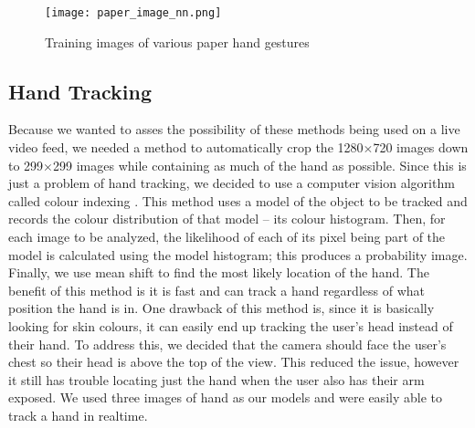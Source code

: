 \begin{figure}[h]
\texttt{[image: paper\_image\_nn.png]}
\centering
\caption{Training images of various paper hand gestures}
\end{figure}



\subsection{Hand Tracking}
Because we wanted to asses the possibility of these methods being used on a live video feed, we needed a method to automatically crop the 1280$\times$720 images down to 299$\times$299 images while containing as much of the hand as possible. Since this is just a problem of hand tracking, we decided to use a computer vision algorithm called colour indexing \cite{swain}. This method uses a model of the object to be tracked and records the colour distribution of that model -- its colour histogram. Then, for each image to be analyzed, the likelihood of each of its pixel being part of the model is calculated using the model histogram; this produces a probability image. Finally, we use mean shift to find the most likely location of the hand. The benefit of this method is it is fast and can track a hand regardless of what position the hand is in. One drawback of this method is, since it is basically looking for skin colours, it can easily end up tracking the user's head instead of their hand. To address this, we decided that the camera should face the user's chest so their head is above the top of the view. This reduced the issue, however it still has trouble locating just the hand when the user also has their arm exposed. We used three images of hand as our models and were easily able to track a hand in realtime. 
